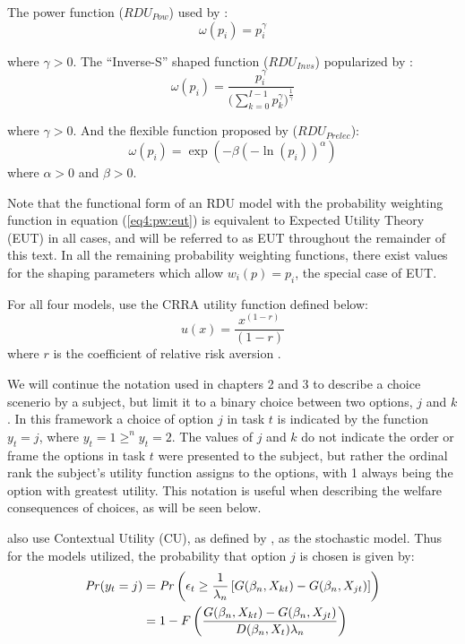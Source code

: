 \documentclass[../main.tex]{subfiles}
\begin{document}
\noindent The power function ($\mathit{RDU_{Pow}}$) used by \textcite{Quiggin1982}:
\begin{equation}
	\label{eq4:pw:quiggin}
	\omega(p_i)=p_i^\gamma
\end{equation}

\noindent where $\gamma > 0$. The \enquote{Inverse-S} shaped function ($\mathit{RDU_{Invs}}$) popularized by \textcite{Tversky1992}:
\begin{equation}
	\label{eq4:pw:kahneman}
	\omega(p_i) = \frac{p_i^\gamma}{\biggl(\sum\limits_{k=0}^{I-1} p_k^\gamma\biggr)^{ \frac{1}{\gamma} } }
\end{equation}

\noindent where $\gamma > 0$. And the flexible function proposed by \textcite{Prelec1998} ($\mathit{RDU_{Prelec}}$):
\begin{equation}
	\label{eq4:pw:prelec}
	\omega(p_i)=\exp(-\beta(-\ln(p_i))^\alpha)
\end{equation}
\noindent where $\alpha > 0$ and $\beta > 0$.

Note that the functional form of an RDU model with the probability weighting function in equation (\ref{eq4:pw:eut}) is equivalent to Expected Utility Theory (EUT) in all cases, and will be referred to as EUT throughout the remainder of this text.
In all the remaining probability weighting functions, there exist values for the shaping parameters which allow $w_i(p) = p_i$, the special case of EUT.

For all four models, \textcite{Harrison2016} use the CRRA utility function defined below:
\begin{equation}
	\label{eq4:CRRA}
	u(x) = \frac{x^{(1-r)}}{(1-r)}
\end{equation}
\noindent where $r$ is the coefficient of relative risk aversion \parencite{Pratt1964}.

We will continue the notation used in chapters 2 and 3 to describe a choice scenerio by a subject, but limit it to a binary choice between two options, $j$ and $k$.
In this framework a choice of option $j$ in task $t$ is indicated by the function $y_t = j$, where $y_t = 1 \geq^n y_t = 2$.
The values of $j$ and $k$ do not indicate the order or frame the options in task $t$ were presented to the subject, but rather the ordinal rank the subject's utility function assigns to the options, with 1 always being the option with greatest utility.
This notation is useful when describing the welfare consequences of choices, as will be seen below.

\textcite{Harrison2016} also use Contextual Utility (CU), as defined by \textcite{Wilcox2008}, as the stochastic model.
Thus for the models utilized, the probability that option $j$ is chosen is given by:
\begin{align}
	\label{eq4:RE.2}
	\begin{split}
	{\ensuremath{\mathit{Pr}}}(y_t = j) &= {\mathit{Pr}}\left(  \epsilon_t \geq \frac{1}{\lambda_n} \left[ G(\beta_n,X_{kt}) - G(\beta_n,X_{jt}) \right] \right)\\
	&= 1 - F\left( \dfrac{G(\beta_n,X_{kt}) - G(\beta_n,X_{jt})}{D(\beta_n,X_t)\lambda_n }  \right)
	\end{split}
\end{align}
\end{document}
